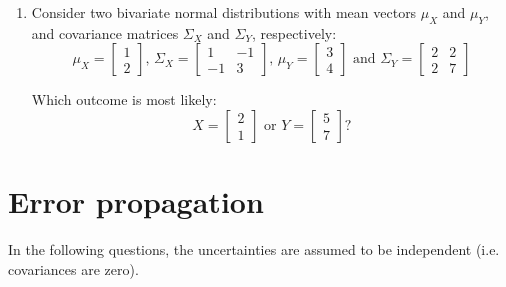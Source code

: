 \begin{enumerate}
\item Consider two bivariate normal distributions with mean vectors
  $\mu_X$ and $\mu_Y$, and covariance matrices $\Sigma_X$ and
  $\Sigma_Y$, respectively:
  \[
  \mu_X =
  \left[
    \begin{array}{c}
      1\\
      2
    \end{array}
    \right]\mbox{,~}
  \Sigma_X =
  \left[
    \begin{array}{cc}
      1 & -1\\
      -1 & 3
    \end{array}
    \right]\mbox{,~}
  \mu_Y =
  \left[
    \begin{array}{c}
      3\\
      4
    \end{array}
    \right]\mbox{~and~}
  \Sigma_Y =
  \left[
    \begin{array}{cc}
      2 & 2\\
      2 & 7
    \end{array}
    \right]  
  \]

  Which outcome is most likely:
  \[
  X =
  \left[
    \begin{array}{c}
      2\\
      1
    \end{array}
    \right]\mbox{~or~}
  Y =
  \left[
    \begin{array}{c}
      5\\
      7
    \end{array}
    \right]\mbox{?}
  \]
  
\end{enumerate}

\section{Error propagation}
\label{sec:ex-errorprop}

In the following questions, the uncertainties are assumed to be
independent (i.e. covariances are zero).

